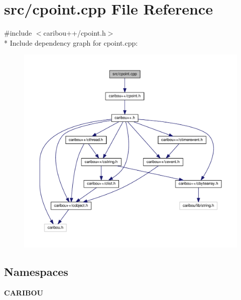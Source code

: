 \section{src/cpoint.cpp File Reference}
\label{cpoint_8cpp}
{\ttfamily \#include $<$caribou++/cpoint.\-h$>$}\\*
Include dependency graph for cpoint.\-cpp\-:\nopagebreak
\begin{figure}[H]
\begin{center}
\leavevmode
\includegraphics[width=350pt]{cpoint_8cpp__incl}
\end{center}
\end{figure}
\subsection*{Namespaces}
\begin{DoxyCompactItemize}
\item 
{\bf C\-A\-R\-I\-B\-O\-U}
\end{DoxyCompactItemize}

